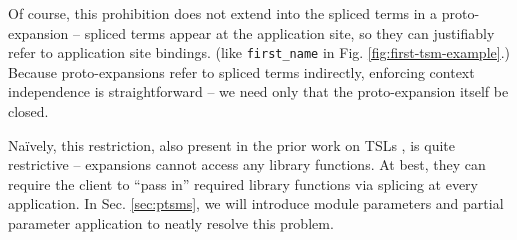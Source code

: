 \documentclass[acmsmall,review,anonymous]{acmart}\settopmatter{printfolios=true,printccs=false,printacmref=false}
\newcommand{\li}[1]{\lstinline[basicstyle=\ttfamily\fontsize{9pt}{1em}\selectfont]{#1}}
\begin{document}
Of course, this prohibition does not extend into the spliced terms in a proto-expansion -- spliced terms appear at the application site, so they can justifiably refer to application site bindings. (like \li{first_name} in Fig. \ref{fig:first-tsm-example}.) Because proto-expansions refer to spliced terms indirectly, enforcing context independence is straightforward -- we need only that the proto-expansion itself be closed.%

Na\"ively, this restriction, also present in the prior work on TSLs \cite{TSLs}, is quite restrictive -- expansions cannot access any library functions. At best, they can require the client to ``pass in'' required library functions via splicing at every application. In Sec. \ref{sec:ptsms}, we will introduce module parameters and partial parameter application to neatly resolve this problem. 



\end{document}
